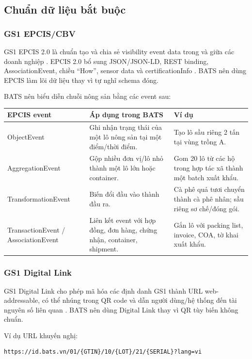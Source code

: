 \documentclass[12pt,a4paper]{article}
\begin{document}
\subsection{Chuẩn dữ liệu bắt buộc}

\subsubsection{GS1 EPCIS/CBV}

GS1 EPCIS 2.0 là chuẩn tạo và chia sẻ visibility event data trong và giữa các doanh nghiệp \cite{gs1_epcis}. EPCIS 2.0 bổ sung JSON/JSON-LD, REST binding, AssociationEvent, chiều ``How'', sensor data và certificationInfo \cite{gs1_epcis}. BATS nên dùng EPCIS làm lõi dữ liệu thay vì tự nghĩ schema đóng.

BATS nên biểu diễn chuỗi nông sản bằng các event sau:

\begin{longtable}{p{4cm}p{5cm}p{5cm}}
\toprule
\textbf{EPCIS event} & \textbf{Áp dụng trong BATS} & \textbf{Ví dụ} \\
\midrule
\endhead
ObjectEvent & Ghi nhận trạng thái của một lô nông sản tại một điểm/thời điểm. & Tạo lô sầu riêng 2 tấn tại vùng trồng A. \\
\addlinespace
AggregationEvent & Gộp nhiều đơn vị/lô nhỏ thành một lô lớn hoặc container. & Gom 20 lô từ các hộ trong hợp tác xã thành một batch xuất khẩu. \\
\addlinespace
TransformationEvent & Biến đổi đầu vào thành đầu ra. & Cà phê quả tươi chuyển thành cà phê nhân; sầu riêng sơ chế/đóng gói. \\
\addlinespace
TransactionEvent / AssociationEvent & Liên kết event với hợp đồng, đơn hàng, chứng nhận, container, shipment. & Gắn lô với packing list, invoice, COA, tờ khai xuất khẩu. \\
\bottomrule
\end{longtable}

\subsubsection{GS1 Digital Link}

GS1 Digital Link cho phép mã hóa các định danh GS1 thành URL web-addressable, có thể nhúng trong QR code và dẫn người dùng/hệ thống đến tài nguyên số liên quan \cite{gs1_digital_link}. BATS nên dùng Digital Link thay vì QR tùy biến không chuẩn.

Ví dụ URL khuyến nghị:

\begin{lstlisting}[basicstyle=\ttfamily\small,breaklines=true]
https://id.bats.vn/01/{GTIN}/10/{LOT}/21/{SERIAL}?lang=vi
\end{lstlisting}
\end{document}
